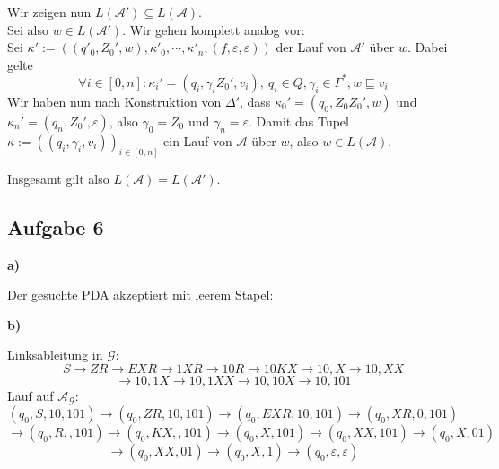 \documentclass[a4paper,graphics,11pt]{article}
\newcommand{\aufgabe}[1]{\subsection*{Aufgabe #1}}
\begin{document}
Wir zeigen nun $L(\mathcal{A}') \subseteq L(\mathcal{A})$.\\
Sei also $w \in L(\mathcal{A}')$. Wir gehen komplett analog vor:\\
Sei $\kappa' := ((q'_0, Z_0', w), \kappa'_0, \cdots, \kappa'_n, (f, \varepsilon, \varepsilon))$
der Lauf von $\mathcal{A}'$ über $w$. Dabei gelte
$$
    \forall i \in [0,n] : \kappa_i' = (q_i, \gamma_iZ_0', v_i),\ q_i \in Q, \gamma_i \in \Gamma^*, w \sqsubseteq v_i
$$
Wir haben nun nach Konstruktion von $\Delta'$, dass $\kappa_0' = (q_0, Z_0Z_0', w)$ und
$\kappa_n' = (q_n, Z_0', \varepsilon)$, also $\gamma_0 = Z_0$ und $\gamma_n = \varepsilon$.
Damit das Tupel $\kappa := ((q_i, \gamma_i, v_i))_{i \in [0,n]}$ ein Lauf von $\mathcal{A}$ über $w$,
also $w \in L(\mathcal{A})$.

Insgesamt gilt also $L(\mathcal{A}) = L(\mathcal{A}')$.


\newpage

\aufgabe{6}
\textbf{a)}

Der gesuchte PDA akzeptiert mit leerem Stapel:
\begin{center}
\end{center}

\textbf{b)}

Linksableitung in $\mathcal{G}:$
$$
    S \to ZR \to EXR \to 1XR \to 10R \to 10KX \to 10,X \to 10,XX
$$$$
    \to 10,1X \to 10,1XX \to 10,10X \to 10,101
$$
Lauf auf $\mathcal{A}_\mathcal{G}:$
$$
    (q_0, S, 10,101) \to
    (q_0, ZR, 10,101) \to
    (q_0, EXR, 10,101) \to
    (q_0, XR, 0,101)
$$$$
    \to (q_0, R, ,101)
    \to (q_0, KX, ,101)
    \to (q_0, X, 101)
    \to (q_0, XX, 101)
    \to (q_0, X, 01)
$$$$
    \to (q_0, XX, 01)
    \to (q_0, X, 1)
    \to (q_0, \varepsilon, \varepsilon)
$$
\end{document}
